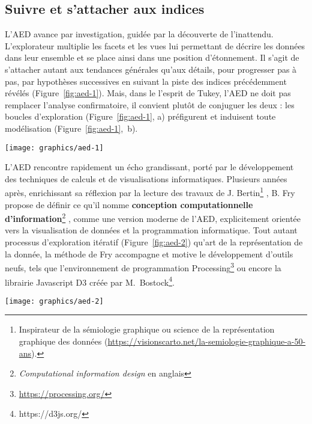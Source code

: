 \documentclass[symmetric,justified,marginals=raggedouter]{tufte-book}
\begin{document}
\subsection{Suivre et s'attacher aux indices}

\noindent L'AED avance par investigation, guidée par la découverte de l'inattendu. L'explorateur multiplie les facets et les vues lui permettant de décrire les données dans leur ensemble et se place ainsi dans une position d'étonnement. Il s'agit de s'attacher autant aux tendances générales qu'aux détails, pour progresser pas à pas, par hypothèses successives en suivant la piste des indices précédemment révélés (Figure~\ref{fig:aed-1}). Mais, dans le l'esprit de Tukey, l'AED ne doit pas remplacer l'analyse confirmatoire, il convient plutôt de conjuguer les deux : les boucles d'exploration (Figure~\ref{fig:aed-1}, a) préfigurent et induisent toute modélisation (Figure~\ref{fig:aed-1},~b). 

\newpage

\begin{figure*}%
  \texttt{[image: graphics/aed-1]}
  \caption{L'analyse exploratoire et les diverses phases de l'exploration préfigurent toute analyse confirmatoire}
  \label{fig:aed-1}
\end{figure*} 

\noindent L'AED rencontre rapidement un écho grandissant, porté par le dé\-veloppement des techniques de calculs et de visualisations informatiques. Plusieurs années après, enrichissant sa réflexion par la lecture des travaux de J. Bertin\footnote{\RaggedOuter Inspirateur de la sémiologie graphique ou science de la représentation graphique des données (\url{https://visionscarto.net/la-semiologie-graphique-a-50-ans}).} \citep{bertin_semiologie_1973}, B. Fry propose de définir ce qu'il nomme \textbf{conception computationnelle d'information}\footnote{\RaggedOuter \textit{Computational information design} en anglais} \citep{fry_computational_2004}, comme une version moderne de l'AED, explicitement orientée vers la visualisation de données et la programmation informatique. Tout autant processus d'exploration itératif (Figure~\ref{fig:aed-2}) qu'art de la représentation de la donnée, la méthode de Fry accompagne et motive le dé\-veloppement d'outils neufs, tels que l'environnement de programmation Processing\footnote{\RaggedOuter \url{https://processing.org/}} ou encore la librairie Javascript D3 créée par M.~Bostock\footnote{\RaggedOuter https://d3js.org/}.

\begin{figure*}%
  \texttt{[image: graphics/aed-2]}
  \caption{Étapes de la conception computationnelle d'information et ensemble des boucles d'analyses possibles selon \citep{fry_computational_2004}}
  \label{fig:aed-2}
\end{figure*} 
\end{document}
